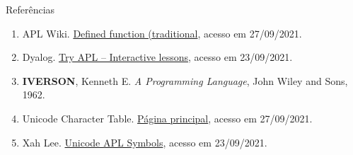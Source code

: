 \begin{frame}[fragile]{Referências}

    \begin{enumerate}
        \item APL Wiki. \href{https://aplwiki.com/wiki/Defined_function_(traditional)}{Defined function (traditional}, acesso em 27/09/2021.

        \item Dyalog. \href{https://tryapl.org/}{Try APL -- Interactive lessons}, acesso em 23/09/2021.
 
        \item \textbf{IVERSON}, Kenneth E. \textit{A Programming Language}, John Wiley and Sons, 1962.
        \item Unicode Character Table. \href{https://unicode-table.com/en}{Página principal}, acesso em 27/09/2021.

        \item Xah Lee. \href{http://xahlee.info/comp/unicode_APL_symbols.html}{Unicode APL Symbols}, acesso em 23/09/2021.
    \end{enumerate}

\end{frame}

